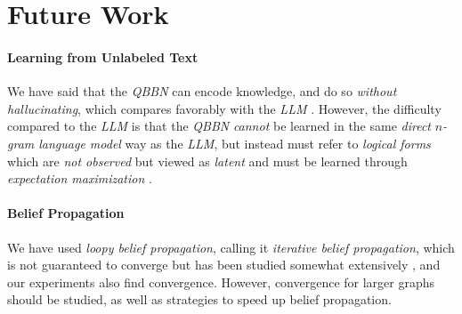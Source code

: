 \documentclass[11pt]{article}
\begin{document}
\section{Future Work}
\paragraph{Learning from Unlabeled Text}
We have said that the {\em QBBN} can encode knowledge, and do so {\em without hallucinating}, which compares favorably with the {\em LLM} \cite{Bahdanau2014NeuralMT, vaswani2017attention, radford2018improving}.
However, the difficulty compared to the {\em LLM} is that the {\em QBBN} {\em cannot} be learned in the same {\em direct} {\em $n$-gram language model} way as the {\em LLM}, but instead must refer to {\em logical forms} which are {\em not observed} but viewed as {\em latent} and must be learned through {\em expectation maximization} \cite{dempster1977maximum}.
\paragraph{Belief Propagation}
We have used {\em loopy belief propagation}, calling it {\em iterative belief propagation}, which is not guaranteed to converge but has been studied somewhat extensively \cite{Murphy2013, Smith2008, Gormley2015}, and our experiments also find convergence.
However, convergence for larger graphs should be studied, as well as strategies to speed up belief propagation.
\end{document}
